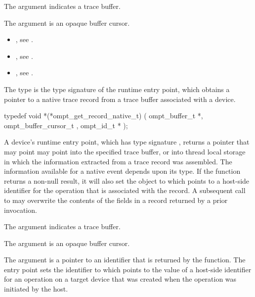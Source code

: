 \argdesc
The  argument indicates a trace buffer.

The  argument is an opaque buffer cursor.

\crossreferences
\begin{itemize}
\item {}, see .

\item {}, see .

\item {}, see .
\end{itemize}



\label{sec:ompt_get_record_native_t}

\summary
The  type is the type signature of the 
 runtime entry point, which obtains a pointer 
to a native trace record from a trace buffer associated with a device.

\format
\begin{ccppspecific}
\begin{omptInquiry}
typedef void *(*ompt_get_record_native_t) (
  ompt_buffer_t *,
  ompt_buffer_cursor_t ,
  ompt_id_t *
);
\end{omptInquiry}
\end{ccppspecific}

\descr
A device's  runtime entry point, which has
type signature , returns a pointer that may 
point may point into the specified trace buffer, or into thread local 
storage in which the information extracted from a trace record was 
assembled. The information available for a native event depends upon 
its type. If the function returns a non-null result, it will also set the
object to which  points to a host-side identifier for the 
operation that is associated with the record. A subsequent call to 
 may overwrite the contents of the fields 
in a record returned by a prior invocation.

\argdesc
The  argument indicates a trace buffer.

The  argument is an opaque buffer cursor.

The  argument is a pointer to an identifier that is 
returned by the function. The entry point sets the identifier to which
 points to the value of a host-side identifier for an 
operation on a target device that was created when the operation was 
initiated by the host.

